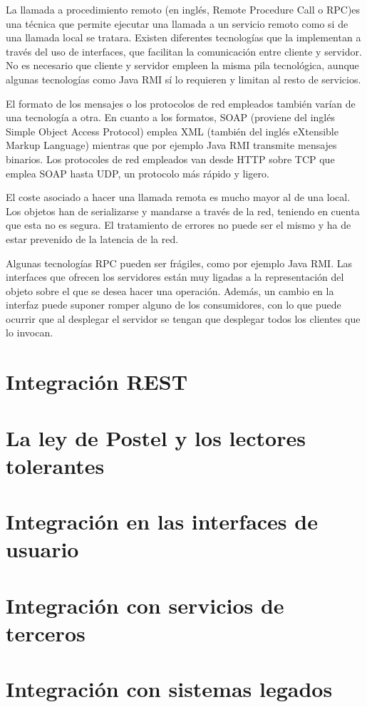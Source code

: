 \documentclass[11pt,a4paper]{article}
\begin{document}
La llamada a procedimiento remoto (en inglés, Remote Procedure Call o RPC)es una técnica que permite ejecutar una llamada a un servicio remoto como si de una llamada local se tratara. Existen diferentes tecnologías que la implementan a través del uso de interfaces, que facilitan la comunicación entre cliente y servidor. No es necesario que cliente y servidor empleen la misma pila tecnológica, aunque algunas tecnologías como Java RMI sí lo requieren y limitan al resto de servicios.

El formato de los mensajes o los protocolos de red empleados también varían de una tecnología a otra. En cuanto a los formatos, SOAP (proviene del inglés Simple Object Access Protocol) emplea XML (también del inglés eXtensible Markup Language) mientras que por ejemplo Java RMI transmite mensajes binarios. Los protocoles de red empleados van desde HTTP sobre TCP que emplea SOAP hasta UDP, un protocolo más rápido y ligero.

El coste asociado a hacer una llamada remota es mucho mayor al de una local. Los objetos han de serializarse y mandarse a través de la red, teniendo en cuenta que esta no es segura. El tratamiento de errores no puede ser el mismo y ha de estar prevenido de la latencia de la red.

Algunas tecnologías RPC pueden ser frágiles, como por ejemplo Java RMI. Las interfaces que ofrecen los servidores están muy ligadas a la representación del objeto sobre el que se desea hacer una operación. Además, un cambio en la interfaz puede suponer romper alguno de los consumidores,  con lo que puede ocurrir que al desplegar el servidor se tengan que desplegar todos los clientes que lo invocan.

\section{Integración REST}

\section{La ley de Postel y los lectores tolerantes}

\section{Integración en las interfaces de usuario}

\section{Integración con servicios de terceros}

\section{Integración con sistemas legados}
\end{document}
